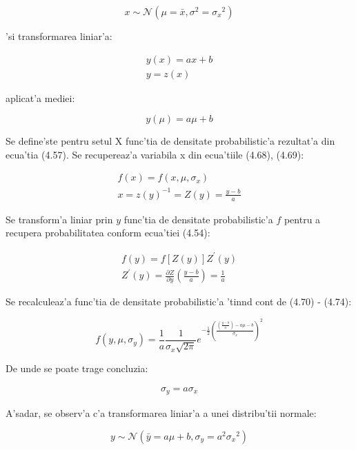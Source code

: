 \documentclass[12pt,a4paper,twoside]{report}
\begin{document}
\begin{equation}
    x \sim \mathcal{N}(\mu = \bar x, \sigma^2 = {\sigma_x}^2)
\end{equation}

'si transformarea liniar'a:

\begin{gather}
    y(x) = ax + b \\
    y = z(x)
\end{gather}

aplicat'a mediei:

\begin{equation}
        y(\mu) = a \mu + b
\end{equation}

Se define'ste pentru setul X func'tia de densitate probabilistic'a rezultat'a din ecua'tia (4.57). Se recupereaz'a variabila x \cite{LinearProb} din ecua'tiile (4.68), (4.69):

\begin{gather}
    f(x) = f(x,\mu,\sigma_x) \\
    x = z(y)^{-1} = Z(y) = \frac{y-b}{a}
\end{gather}

Se transform'a liniar  \cite{LinearProb} prin $y$ func'tia de densitate probabilistic'a $f$  pentru a recupera probabilitatea conform ecua'tiei (4.54):

\begin{gather}
    f(y) = f[Z(y)] Z ^\prime(y) \\
    Z ^\prime(y) =  \frac{\partial Z}{\partial y} (\frac{y-b}{a}) = \frac{1}{a}
\end{gather}

Se recalculeaz'a func'tia de densitate probabilistic'a  \cite{LinearProb} 'tin\ia nd cont de (4.70) - (4.74):

\begin{equation}
 f(y, \mu, \sigma_y) = \frac{1}{a} \frac{1}{\sigma_x \sqrt{2 \pi}} e^{-\frac{1}{2} ( \frac{ ( \frac{y-b}{a} ) - a \mu - b}{\sigma_x} ) ^2}
\end{equation}

De unde se poate trage concluzia:

\begin{gather}
\sigma_y = a \sigma_x 
\end{gather}

A'sadar, se observ'a c'a transformarea liniar'a a unei distribu'tii normale:

\begin{equation}
    y \sim \mathcal{N}(\bar y = a \mu + b, \sigma_y = a^2 {\sigma_x}^2)
\end{equation}
\end{document}
